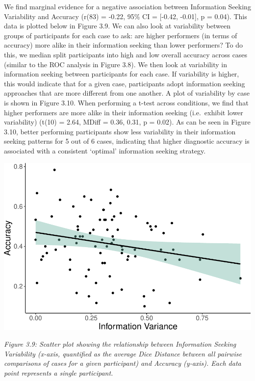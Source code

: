 \documentclass[a4paper, nobind]{templates/ociamthesis}
\begin{document}
\hfill\break
We find marginal evidence for a negative association between Information Seeking Variability and Accuracy (r(83) = -0.22, 95\% CI = {[}-0.42, -0.01{]}, p = 0.04). This data is plotted below in Figure 3.9. We can also look at variability between groups of participants for each case to ask: are higher performers (in terms of accuracy) more alike in their information seeking than lower performers? To do this, we median split participants into high and low overall accuracy across cases (similar to the ROC analysis in Figure 3.8). We then look at variability in information seeking between participants for each case. If variability is higher, this would indicate that for a given case, participants adopt information seeking approaches that are more different from one another. A plot of variability by case is shown in Figure 3.10. When performing a t-test across conditions, we find that higher performers are more alike in their information seeking (i.e.~exhibit lower variability) (t(10) = 2.64, MDiff = 0.36, 0.31, p = 0.02). As can be seen in Figure 3.10, better performing participants show less variability in their information seeking patterns for 5 out of 6 cases, indicating that higher diagnostic accuracy is associated with a consistent `optimal' information seeking strategy.

\begin{center}\includegraphics[width=1\linewidth]{_main_files/figure-latex/accVarPlot-1} \end{center}

\emph{Figure 3.9: Scatter plot showing the relationship between Information Seeking Variability (x-axis, quantified as the average Dice Distance between all pairwise comparisons of cases for a given participant) and Accuracy (y-axis). Each data point represents a single participant.}
\end{document}
